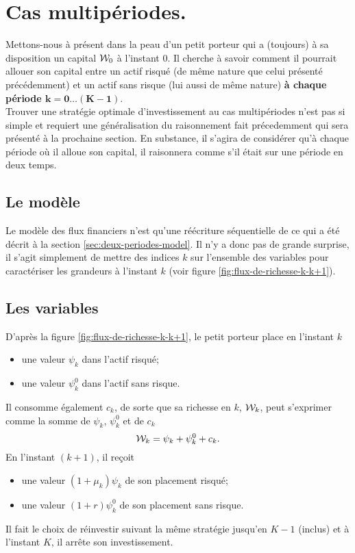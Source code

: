\documentclass{article}
\numberwithin{equation}{section}
\begin{document}
\section{Cas multipériodes.}\label{sec:multiperiodes}

Mettons-nous à présent dans la peau d'un petit porteur qui a (toujours) à sa disposition un capital $\mathcal{W}_0$ à l'instant $0$. Il cherche à savoir comment il pourrait allouer son capital entre un actif risqué (de même nature que celui présenté précédemment) et un actif sans risque (lui aussi de même nature) \textbf{\color{awesomePurple} à chaque période $\boldsymbol{k = 0\dots (K - 1)}$}.\\

Trouver une stratégie optimale d'investissement au cas multipériodes n'est pas si simple et requiert une généralisation du raisonnement fait précedemment qui sera présenté à la prochaine section. En substance, il s'agira de considérer qu'à chaque période où il alloue son capital, il raisonnera comme s'il était sur une période en deux temps.

\subsection{Le modèle}

Le modèle des flux financiers n'est qu'une réécriture séquentielle de ce qui a été décrit à la section \ref{sec:deux-periodes-model}. Il n'y a donc pas de grande surprise, il s'agit simplement de mettre des indices $k$ sur l'ensemble des variables pour caractériser les grandeurs à l'instant $k$ (voir figure \ref{fig:flux-de-richesse-k-k+1}).\\

\subsection{Les variables}

D'après la figure \ref{fig:flux-de-richesse-k-k+1}, le petit porteur place en l'instant $k$ 
\begin{itemize}
\item une valeur $\psi_k$ dans l'actif risqué;
\item une valeur $\psi^0_k$ dans l'actif sans risque.
\end{itemize}
Il consomme également $c_k$, de sorte que sa richesse en $k$, $\mathcal{W}_k$, peut s'exprimer comme la somme de $\psi_k$, $\psi^0_k$ et de $c_k$
\begin{equation}\label{eq:conservation-k}
\mathcal{W}_k = \psi_k + \psi^0_k + c_k.
\end{equation}
En l'instant $(k + 1)$, il reçoit 
\begin{itemize}
\item une valeur $(1 + \mu_k)\psi_k$ de son placement risqué;
\item une valeur $(1 + r)\psi_k^0$ de son placement sans risque.
\end{itemize}
Il fait le choix de réinvestir suivant la même stratégie jusqu'en $K - 1$ (inclus) et à l'instant $K$, il arrête son investissement.\\
\end{document}
